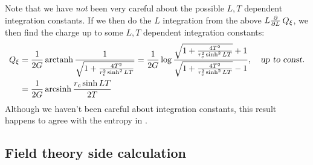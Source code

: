 \documentclass[11pt,a4paper]{article}
\begin{document}
	Note that we have \textit{not} been very careful about the possible $L,T$ dependent integration constants. If we then do the $L$ integration from the above $L \pdv{L}\,Q_\xi$, we then find the charge up to some $L,T$ dependent integration constants:
	\begin{equation}
	\begin{aligned}
		Q_\xi
		&= \frac{1}{2G} \operatorname{arctanh}
			\frac{1}{\sqrt{
				1 + \frac{4T^2}{r_c^2 \sinh^2 LT}
			}}
		= \frac{1}{2G} \log
			\frac{
				\sqrt{
					1 + \frac{4T^2}{r_c^2 \sinh^2 LT}
				} + 1
			}{
				\sqrt{
					1 + \frac{4T^2}{r_c^2 \sinh^2 LT}
				} - 1
			},
	\quad\textsl{up to const.} \\
		&= \frac{1}{2G} \operatorname{arcsinh}
			\frac{r_c \sinh LT}{2T}
	\end{aligned}
	\end{equation}
	Although we haven't been careful about integration constants, this result happens to agree with the entropy in \cite{Lewkowycz:2019xse}. 
	
\subsection{Field theory side calculation}
	
	

\FloatBarrier

\pagebreak

 





\end{document}
